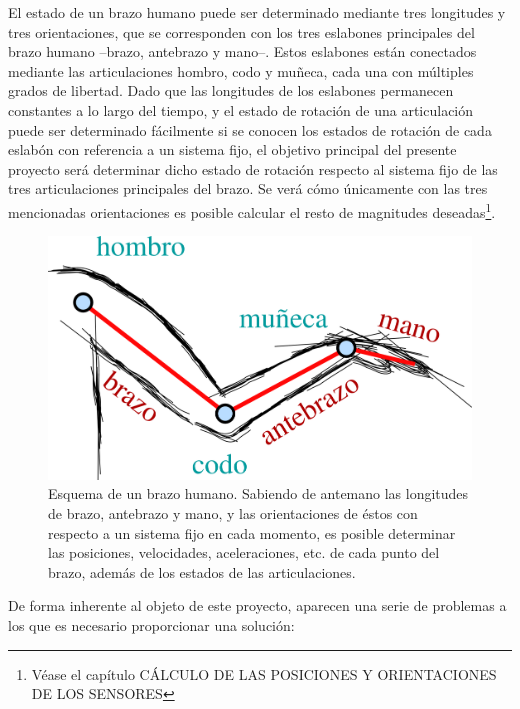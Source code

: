 \documentclass[12pt, a4paper]{report}
\begin{document}
El estado de un brazo humano puede ser determinado mediante tres longitudes y tres orientaciones, que se corresponden con los tres eslabones principales del brazo humano --brazo, antebrazo y mano--. Estos eslabones están conectados mediante las articulaciones hombro, codo y muñeca, cada una con múltiples grados de libertad. Dado que las longitudes de los eslabones permanecen constantes a lo largo del tiempo, y el estado de rotación de una articulación puede ser determinado fácilmente si se conocen los estados de rotación de cada eslabón con referencia a un sistema fijo, el objetivo principal del presente proyecto será determinar dicho estado de rotación respecto al sistema fijo de las tres articulaciones principales del brazo. Se verá cómo únicamente con las tres mencionadas orientaciones es posible calcular el resto de magnitudes deseadas\footnote{Véase el capítulo CÁLCULO DE LAS POSICIONES Y ORIENTACIONES DE LOS SENSORES}.\\

\begin{figure}[h]
	\centering
		\includegraphics[scale=0.6]{../img/brazo.png} 
	\caption[Esquema de un brazo humano]{Esquema de un brazo humano. Sabiendo de antemano las longitudes de  brazo, antebrazo y mano, y las orientaciones de éstos con respecto a un sistema fijo en cada momento, es posible determinar las posiciones, velocidades, aceleraciones, etc. de cada punto del brazo, además de los estados de las articulaciones.} 
\end{figure}

De forma inherente al objeto de este proyecto, aparecen una serie de problemas a los que es necesario proporcionar una solución: 
\end{document}
